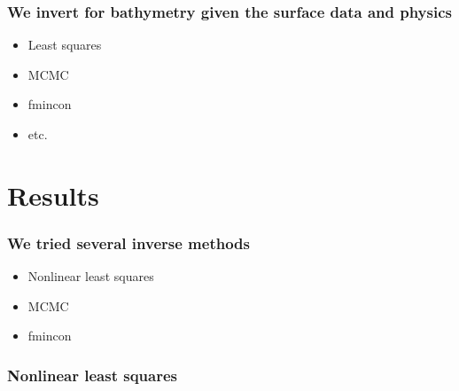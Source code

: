 \documentclass[7pt]{beamer}
\begin{document}
\begin{frame}
 \frametitle{We invert for bathymetry given the surface data and physics}

\begin{itemize}
\item Least squares
\item MCMC
\item fmincon
\item etc.
\end{itemize}


\end{frame}
\section{Results}

\begin{frame}
 \frametitle{We tried several inverse methods}
\begin{itemize}
\item Nonlinear least squares
\item MCMC
\item fmincon
\end{itemize}
\end{frame}


 \begin{frame}
\frametitle{Nonlinear least squares}


\end{frame}


\end{document}
